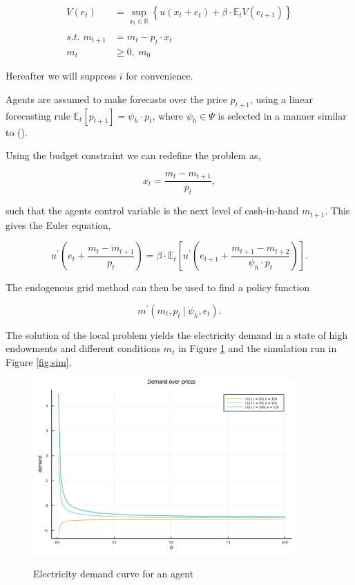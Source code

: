 \documentclass[american]{scrartcl}
\newcommand{\E}{\mathbb{E}}
\newcommand{\R}{\mathbb{R}}
\begin{document}
\begin{equation*}
	\begin{split}
		V(e_t) &= \sup_{x_t \in \R} \left\{u(x_t + e_t) + \beta \cdot \E_t V( e_{t+1} ) \right\} \\
		\\
		\textit{s.t. } m_{t+1} &= m_{t} - p_{t} \cdot x_{t}\\
		m_t  &\geq 0, \ m_0
	\end{split}
\end{equation*}

Hereafter we will suppress $i$ for convenience.

Agents are assumed to make forecasts over the price $p_{t+1}$, using a linear forecasting rule $\E_t[p_{t+1}] = \psi_h\cdot p_t$, where $\psi_h \in \Psi$ is selected in a manner similar to \citeauthor{Hommes2013} (\citeyear{Hommes2013}).

Using the budget constraint we can redefine the problem as,

\begin{equation}
	x_t = \frac{m_t - m_{t+1}}{p_t},
\end{equation}

such that the agents control variable is the next level of cash-in-hand $m_{t+1}$. This gives the Euler equation,

\begin{equation}
	u^\prime\left( e_t + \frac{m_t - m_{t+1}}{p_t} \right) = \beta \cdot \E_t \left[ u^\prime\left(e_{t+1} + \frac{m_{t+1} - m_{t+2}}{ \psi_h \cdot p_t} \right)  \right].
\end{equation}

The endogenous grid method can then be used to find a policy function

\begin{equation}
	m^\prime(m_t, p_t \ \vert \ \psi_h, e_t).
\end{equation}

The solution of the local problem yields the electricity demand in a state of high endowments and different conditions $m_t$ in Figure \ref{fig:demand} and the simulation run in Figure \ref{fig:sim}.

\begin{figure}[b]
	\centering
	\includegraphics[width=0.9\textwidth]{../../plots/markets/pricedemand.png}
	\label{fig:demand}
	\caption{Electricity demand curve for an agent}
\end{figure}
\end{document}
